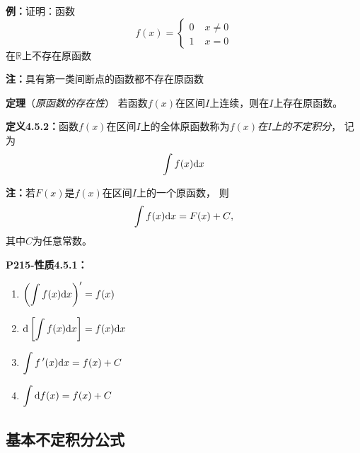 {\bf 例：}证明：函数$$f(x)=\left\{\begin{array}{ll}
0\;& x\ne 0\\1\;& x=0\end{array}\right.$$在$\mathbb{R}$上不存在原函数

{\bf 注：}{具有第一类间断点的函数都不存在原函数}

{\bf 定理}（{\it 原函数的存在性}）
若函数$f(x)$在区间$I$上连续，则在$I$上存在原函数。

{\bf 定义4.5.2：}函数$f(x)$在区间$I$上的全体原函数称为{\it $f(x)$在$I$上的不定积分}，
记为
$$\int f(x)\mathrm{d} x$$

{\bf 注：}若$F(x)$是$f(x)$在区间$I$上的一个原函数， 则
$${\int f(x)\mathrm{d} x=F(x)+C},$$
其中$C$为任意常数。

{\bf P215-性质4.5.1：}
\begin{enumerate}[(1)]
  \setlength{\itemindent}{1cm}
  \item $\left(\displaystyle\int f(x)\mathrm{d} x\right)'=f(x)$ 
  \item $\mathrm{d}\left[\displaystyle\int f(x)\mathrm{d} x\right]=f(x)\mathrm{d} x$ 
  \item $\displaystyle\int f\,'(x)\mathrm{d} x =f(x)+C$
  \item $\displaystyle\int \mathrm{d} f(x)=f(x)+C$
\end{enumerate}

\subsection{基本不定积分公式}

